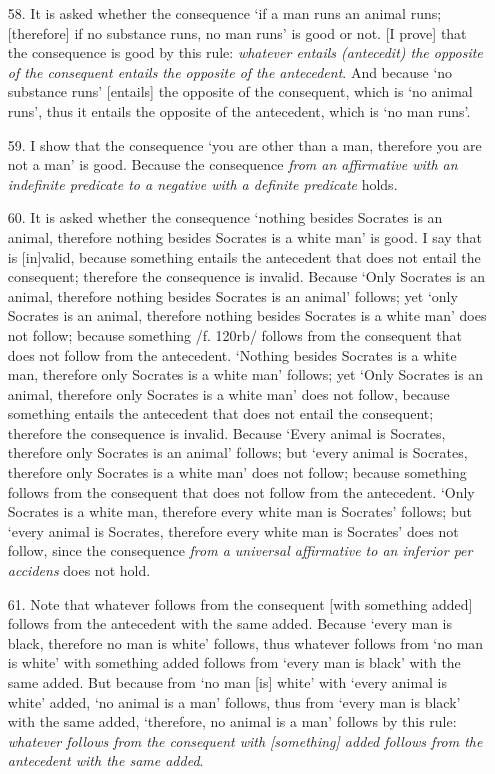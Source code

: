 \begin{enumerate}
\item[58.] It is asked whether the consequence `if a man runs an animal runs; [therefore] if no substance runs, no man runs' is good or not. [I prove] that the consequence is good by this rule: \textit{whatever entails (antecedit) the opposite of the consequent entails the opposite of the antecedent}. And because `no substance runs' [entails] the opposite of the consequent, which is `no animal runs', thus it entails the opposite of the antecedent, which is `no man runs'. 
\item[59.] I show that the consequence `you are other than a man, therefore you are not a man' is good. Because the consequence \textit{from an affirmative with an indefinite predicate to a negative with a definite predicate} holds. 
\item[60.] It is asked whether the consequence `nothing besides Socrates is an animal, therefore nothing besides Socrates is a white man' is good. I say that is [in]valid, because something entails the antecedent that does not entail the consequent; therefore the consequence is invalid. Because `Only Socrates is an animal, therefore nothing besides Socrates is an animal' follows; yet `only Socrates is an animal, therefore nothing besides Socrates is a white man' does not follow; because something /f. 120rb/ follows from the consequent that does not follow from the antecedent. `Nothing besides Socrates is a white man, therefore only Socrates is a white man' follows; yet `Only Socrates is an animal, therefore only Socrates is a white man' does not follow, because something entails the antecedent that does not entail the consequent; therefore the consequence is invalid. Because `Every animal is Socrates, therefore only Socrates is an animal' follows; but `every animal is Socrates, therefore only Socrates is a white man' does not follow; because something follows from the consequent that does not follow from the antecedent. `Only Socrates is a white man, therefore every white man is Socrates' follows; but `every animal is Socrates, therefore every white man is Socrates' does not follow, since the consequence \textit{from a universal affirmative to an inferior per accidens} does not hold.
\item[61.] Note that whatever follows from the consequent [with something added] follows from the antecedent with the same added. Because `every man is black, therefore no man is white' follows, thus whatever follows from `no man is white' with something added follows from `every man is black' with the same added. But because from `no man [is] white' with `every animal is white' added, `no animal is a man' follows, thus from `every man is black' with the same added, `therefore, no animal is a man' follows by this rule: \textit{whatever follows from the consequent with [something] added follows from the antecedent with the same added}.

\end{enumerate}

